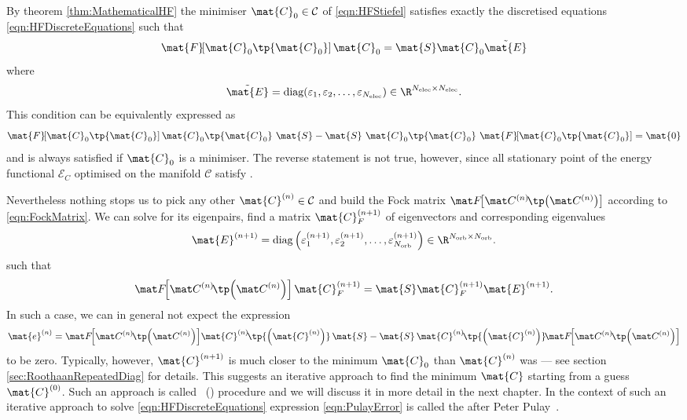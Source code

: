 \begin{rem}
	\label{rem:PropertiesDiscretised}
By theorem \vref{thm:MathematicalHF}
the minimiser $\mat{C}_0 \in \mathcal{C}$ of \eqref{eqn:HFStiefel}
satisfies exactly the discretised \HF equations \eqref{eqn:HFDiscreteEquations}
such that
\newcommand{\matFzfull}{\mat{F}\!\!\left[\mat{C}_0\tp{\mat{C}_0}\right]}
\[
	\matFzfull \mat{C}_0 = \mat{S} \mat{C}_0 \tilde{\mat{E}}
\]
where
\[
	\tilde{\mat{E}} = \text{diag}(\varepsilon_1, \varepsilon_2, \ldots,
		\varepsilon_{\Nelec}) \in \R^{\Nelec \times \Nelec}.
\]
This condition can be equivalently expressed as~\cite{Pulay1982}
\begin{equation}
	\matFzfull \mat{C}_0\tp{\mat{C}_0} \
	\mat{S} - \mat{S} \ \mat{C}_0\tp{\mat{C}_0} \ \matFzfull
	= \mat{0}
	\label{eqn:HFconvergenceCondition}
\end{equation}
and is always satisfied if $\mat{C}_0$ is a minimiser.
The reverse statement is not true, however,
since all stationary point of the energy functional
$\mathcal{E}_C$ optimised on the manifold $\mathcal{C}$
satisfy \label{eqn:HFconvergenceCondition}.

Nevertheless nothing stops us to pick any other $\mat{C}^{(n)} \in \mathcal{C}$
and build the Fock matrix $\matFnfull$
according to \eqref{eqn:FockMatrix}.
We can solve for its eigenpairs, \ie find a matrix $\mat{C}_F^{(n+1)}$
of eigenvectors and corresponding eigenvalues
\[
	\mat{E}^{(n+1)}
	= \text{diag}\left(\varepsilon_1^{(n+1)},
	\varepsilon_2^{(n+1)}, \ldots,
	\varepsilon_{\Norb}^{(n+1)}\right) \in \R^{\Norb \times \Norb}.
\]
such that
\begin{equation}
	\matFnfull \mat{C}_F^{(n+1)} = \mat{S} \mat{C}_F^{(n+1)} \mat{E}^{(n+1)}.
	\label{eqn:HFiterated}
\end{equation}
In such a case, we can in general not expect the expression
\begin{equation}
	\mat{e}^{(n)}
	= \matFnfull \! \mat{C}^{(n)}\!\tp{\left(\mat{C}^{(n)}\right)} \, \mat{S}
	- \mat{S} \, \mat{C}^{(n)}\!\tp{\left(\mat{C}^{(n)}\right)} \! \matFnfull
	\label{eqn:PulayError}
\end{equation}
to be zero.
Typically, however, $\mat{C}^{(n+1)}$ is
much closer to the minimum $\mat{C}_0$ than $\mat{C}^{(n)}$
was --- see section \vref{sec:RoothaanRepeatedDiag} for details.
This suggests an iterative approach to find the minimum $\mat{C}$
starting from a guess $\mat{C}^{(0)}$.
Such an approach is called ~(\SCF) procedure
and we will discuss it in more detail in the next chapter.
In the context of such an iterative approach
to solve \eqref{eqn:HFDiscreteEquations}
expression \eqref{eqn:PulayError} is called the 
after Peter Pulay~\cite{Pulay1982}.


\end{rem}
